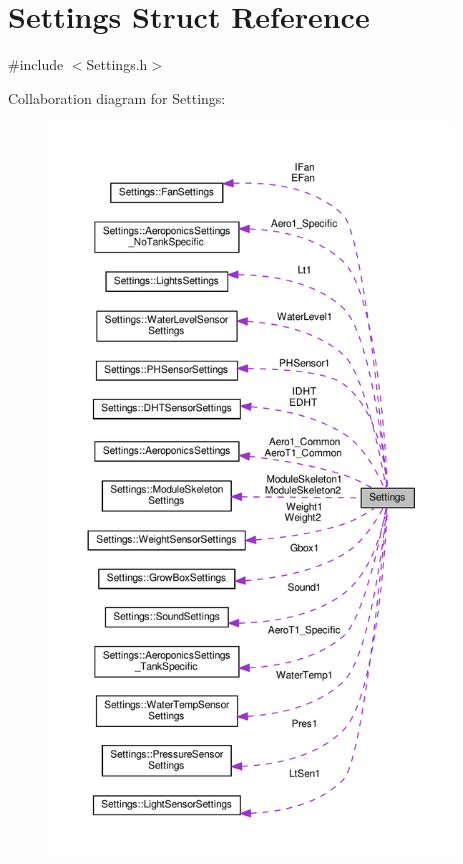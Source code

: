 \hypertarget{struct_settings}{}\section{Settings Struct Reference}
\label{struct_settings}


{\ttfamily \#include $<$Settings.\+h$>$}



Collaboration diagram for Settings\+:
\nopagebreak
\begin{figure}[H]
\begin{center}
\leavevmode
\includegraphics[height=550pt]{struct_settings__coll__graph}
\end{center}
\end{figure}

